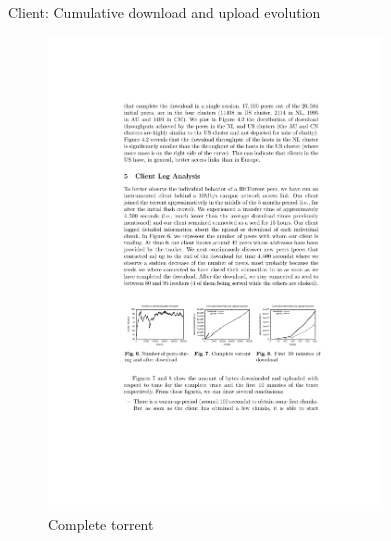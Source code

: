 \begin{frame}{Client: Cumulative download and upload evolution}
	
\begin{figure}	
	\includegraphics[width=0.79\textwidth]{figs/10/bt-fig3}
	\caption{Complete torrent}
\end{figure}	
	
\end{frame}

